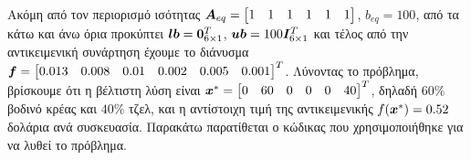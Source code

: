 Ακόμη από τον περιορισμό ισότητας $\boldsymbol{A}_{eq} = \begin{bmatrix}1 & 1 & 1 & 1 & 1 & 1\end{bmatrix}$,
$b_{eq} = 100$, από τα κάτω και άνω όρια προκύπτει
$\bm{lb} = \bm{0}_{6\times 1}^T$, $\bm{ub} = 100\bm{I}_{6 \times 1}^T$
και τέλος από την αντικειμενική συνάρτηση έχουμε το διάνυσμα
$\bm{f} = \begin{bmatrix}0.013 & 0.008 & 0.01 & 0.002 & 0.005 & 0.001\end{bmatrix}^T$.
Λύνοντας το πρόβλημα, βρίσκουμε ότι η βέλτιστη λύση είναι
$\bm{x}^* = \begin{bmatrix} 0 & 60 & 0 & 0 & 0 & 40\end{bmatrix}^T$,
δηλαδή $60\%$ βοδινό κρέας και $40\%$ τζελ, και η αντίστοιχη τιμή της
αντικειμενικής $f(\bm{x}^*) = 0.52$ δολάρια ανά συσκευασία.
Παρακάτω παρατίθεται ο κώδικας που χρησιμοποιήθηκε για να λυθεί το πρόβλημα.
\begin{otherlanguage}{english}

\end{otherlanguage}

